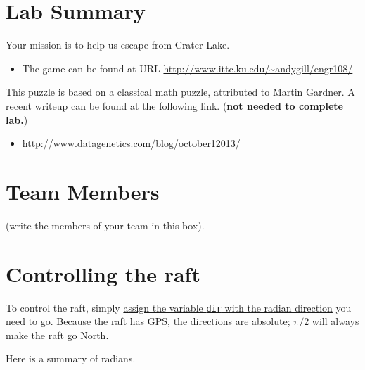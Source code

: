 \documentclass[titlepage]{article}
\newcommand{\drawbox}[1]{\noindent\shadowbox{\parbox{\linewidth-8pt}{\vspace{#1em}~}}\newline}
\begin{document}
\section*{Lab Summary}
\noindent
Your mission is to help us escape from Crater Lake.
\begin{itemize}
\item The game can be found at URL \url{http://www.ittc.ku.edu/~andygill/engr108/}
\end{itemize}
This puzzle is based on a classical math puzzle, attributed to Martin Gardner.
A recent writeup can be found at the following link. ({\bf not needed to complete lab.\/})
\begin{itemize}
\item \url{http://www.datagenetics.com/blog/october12013/}
\end{itemize}

\section*{Team Members}

\noindent(write the members of your team in this box).\\
\drawbox{9}

\section*{Controlling the raft}

To control the raft, simply \underline{assign the variable {\tt dir} with the radian
direction} you need to go. Because the raft has GPS, the directions are absolute;
$\pi/2$ will always make the raft go North.

Here is a summary of radians.
\end{document}
